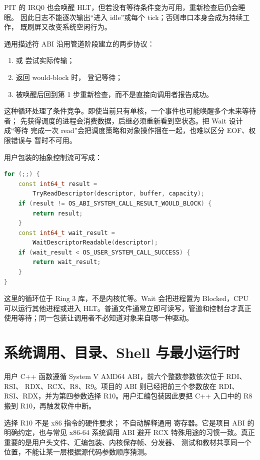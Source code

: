 PIT 的 IRQ0 也会唤醒 HLT，但若没有等待条件变为可用，重新检查后仍会睡眠。
因此日志不能逐次输出“进入 idle”或每个 tick；否则串口本身会成为持续工作，
既刷屏又改变系统空闲行为。

通用描述符 ABI 沿用管道阶段建立的两步协议：

\begin{enumerate}[label=\arabic*.]
  \item {} 或  尝试实际传输；
  \item 返回 would-block 时， 登记等待；
  \item 被唤醒后回到第 1 步重新检查，而不是直接向调用者报告成功。
\end{enumerate}

这种循环处理了条件竞争。即使当前只有单核，一个事件也可能唤醒多个未来等待者；
先获得调度的进程会消费数据，后继必须重新看到空状态。把 Wait 设计成“等待
完成一次 read”会把调度策略和对象操作捆在一起，也难以区分 EOF、权限错误与
暂时不可用。

用户包装的抽象控制流可写成：

\begin{lstlisting}[language=C++]
for (;;) {
    const int64_t result =
        TryReadDescriptor(descriptor, buffer, capacity);
    if (result != OS_ABI_SYSTEM_CALL_RESULT_WOULD_BLOCK) {
        return result;
    }
    const int64_t wait_result =
        WaitDescriptorReadable(descriptor);
    if (wait_result < OS_USER_SYSTEM_CALL_SUCCESS) {
        return wait_result;
    }
}
\end{lstlisting}

这里的循环位于 Ring 3 库，不是内核忙等。Wait 会把进程置为 Blocked，CPU
可以运行其他进程或进入 HLT。普通文件通常立即可读写，管道和控制台才真正
使用等待；同一包装让调用者不必知道对象来自哪一种驱动。

\section{系统调用、目录、Shell 与最小运行时}

用户 C++ 函数遵循 System V AMD64 ABI，前六个整数参数依次位于 RDI、RSI、
RDX、RCX、R8、R9。项目的  ABI 则已经把前三个参数放在
RDI、RSI、RDX，并为第四参数选择 R10。用户汇编包装因此要把 C++ 入口中的
R8 搬到 R10，再触发软件中断。

选择 R10 不是 x86  指令的硬件要求； 不自动解释通用
寄存器。它是项目 ABI 的明确约定，也与常见 x86-64 系统调用 ABI 避开 RCX
特殊用途的习惯一致。真正重要的是用户头文件、汇编包装、内核保存帧、分发器、
测试和教材共享同一个位置，不能让某一层根据源代码参数顺序猜测。

